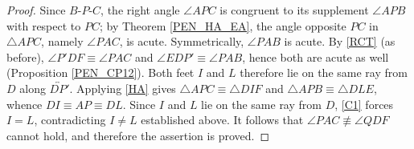 \documentclass[11pt,a4paper]{article}
\theoremstyle{definition}
\theoremstyle{remark}
\numberwithin{equation}{section}
\begin{document}
\begin{proof}
Since $B$-$P$-$C$, the right angle $\angle APC$ is congruent to its supplement
$\angle APB$ with respect to $PC$; by Theorem \ref{PEN_HA_EA}, the angle opposite $PC$ in
$\triangle APC$, namely $\angle PAC$, is acute. Symmetrically, $\angle PAB$ is acute. By
\ref{RCT} (as before), $\angle P'DF\equiv\angle PAC$ and $\angle EDP'\equiv\angle PAB$, hence
both are acute as well (Proposition \ref{PEN_CP12}). Both feet $I$ and $L$ therefore lie on
the same ray from $D$ along $\overleftrightarrow{DP'}$.
Applying \ref{HA} gives $\triangle APC\equiv\triangle DIF$ and $\triangle APB\equiv
\triangle DLE$, whence $DI\equiv AP\equiv DL$. Since $I$ and $L$ lie on the same ray from
$D$, \ref{C1} forces $I=L$, contradicting $I\neq L$ established above. It follows that
$\angle PAC\not\equiv\angle QDF$ cannot hold, and therefore the assertion is proved.
\end{proof}
\end{document}
